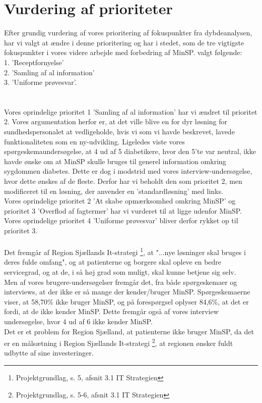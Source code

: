 \section{Vurdering af prioriteter}
Efter grundig vurdering af vores prioritering af fokuspunkter fra dybdeanalysen, har vi valgt at ændre i denne prioritering og har i stedet, som de tre vigtigste fokuspunkter i vores videre arbejde med forbedring af MinSP. valgt følgende:\\
1. 'Receptfornyelse'\\ 
2. 'Samling af al information'\\ 
3. 'Uniforme prøvesvar'.\\
\\\\
Vores oprindelige prioritet 1 'Samling af al information' har vi ændret til prioritet 2.
Vores argumentation herfor er, at det ville blive en for dyr løsning for sundhedspersonalet at vedligeholde, hvis vi som vi havde beskrevet, lavede funktionaliteten som en ny-udvikling.  
Ligeledes viste vores spørgeskemaundersøgelse, at 4 ud af 5 diabetikere, hvor den 5'te var neutral, ikke havde ønske om at MinSP skulle bruges til generel information omkring sygdommen diabetes. Dette er dog i modstrid med vores interview-undersøgelse, hvor dette ønskes af de fleste. Derfor har vi beholdt den som prioritet 2, men modificeret til en løsning, der anvender en 'standardløsning' med links. \\
Vores oprindelige prioritet 2 'At skabe opmærksomhed omkring MinSP' og prioritet 3 'Overflod af fagtermer' har vi vurderet til at ligge udenfor MinSP. Vores oprindelige prioritet 4 'Uniforme prøvesvar' bliver derfor rykket op til prioritet 3.
\\ \\
Det fremgår af Region Sjællands It-strategi \footnote{Projektgrundlag, s. 5, afsnit 3.1 IT Strategien}, at "...nye løsninger skal bruges i deres fulde omfang", og at patienterne og borgere skal opleve en bedre servicegrad, og at de, i så høj grad som muligt, skal kunne betjene sig selv.\\
Men af vores brugere-undersøgelser fremgår det, fra både spørgeskemaer og interviews, at der ikke er så mange der kender/bruger MinSP. Spørgeskemaerne viser, at 58,70\% ikke bruger MinSP, og på forespørgsel oplyser 84,6\%, at det er fordi, at de ikke kender MinSP. Dette fremgår også af vores interview undersøgelse, hvor 4 ud af 6 ikke kender MinSP.\\
Det er et problem for Region Sjælland, at patienterne ikke bruger MinSP, da det er en målsætning i Region Sjællands It-strategi \footnote{Projektgrundlag, s. 5-6, afsnit 3.1 IT Strategien}, at regionen ønsker fuldt udbytte af sine investeringer. 

